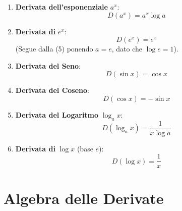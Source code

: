 \begin{enumerate}
    \item \textbf{Derivata dell'esponenziale} \(a^x\):
    \[ D(a^x) = a^x \log a \]
    \pf{
        \[\lim_{ h \to 0 } \frac{a^{x+h}-a^x}{h}=\lim_{ h \to 0 } \frac{a^x(a^h-1)}{h} = a^x\log a\]
    }

    \item \textbf{Derivata di} \(e^x\):
    \[ D(e^x)=e^x \]
    (Segue dalla (5) ponendo \(a=e\), dato che \(\log e = 1\)).

    \item \textbf{Derivata del Seno}:
    \[ D(\sin x)=\cos x \]

    \item \textbf{Derivata del Coseno}:
    \[ D(\cos x)=-\sin x \]

    \item \textbf{Derivata del Logaritmo} \(\log_a x\):
    \[ D(\log_{a}x) = \frac{1}{x \log a} \]

    \item \textbf{Derivata di} \(\log x\) (base \(e\)):
    \[ D(\log x)=\frac{1}{x} \]

\end{enumerate}

\section{Algebra delle Derivate}

